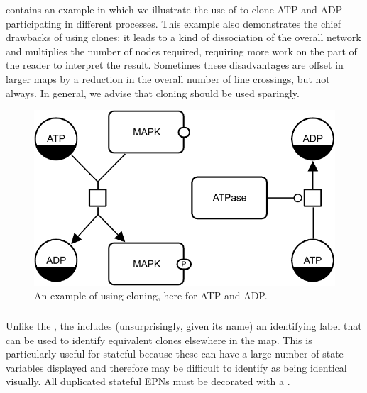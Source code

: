  contains an example in which we illustrate the use of  to clone ATP and ADP participating in different processes.  This example also demonstrates the chief drawbacks of using clones: it leads to a kind of dissociation of the overall network and multiplies the number of nodes required, requiring more work on the part of the reader to interpret the result.  Sometimes these disadvantages are offset in larger maps by a reduction in the overall number of line crossings, but not always.  In general, we advise that cloning should be used sparingly.

\begin{figure}[H]
  \centering
  \includegraphics[scale = 0.8]{images/build/cloning_example.pdf}
  \caption{An example of using cloning, here for ATP and ADP.}
  \label{fig:example-cloning}
\end{figure}

\subsubsection{}

Unlike the , the  includes (unsurprisingly, given its name) an identifying label that can be used to identify equivalent clones elsewhere in the map.
This is particularly useful for stateful  because these can have a large number of state variables displayed and therefore may be difficult to identify as being identical visually.
All duplicated stateful EPNs must be decorated with a .

